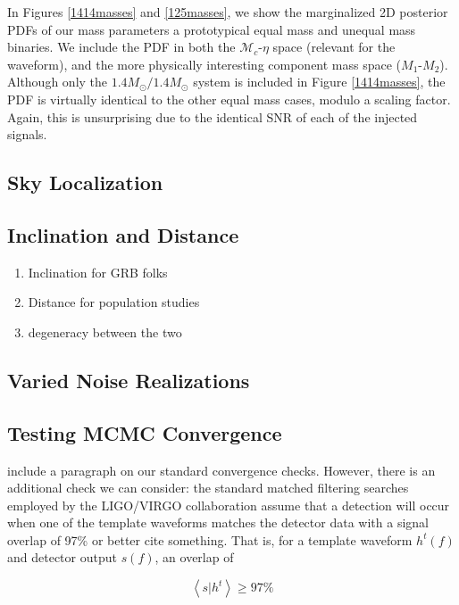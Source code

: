 \documentclass{emulateapj}
\newcommand{\carl}[1]{{\color{red}  #1}}
\begin{document}
In Figures \ref{1414masses} and \ref{125masses}, we show the marginalized 2D posterior PDFs of our mass parameters a prototypical equal mass and unequal mass binaries.  We include the PDF in both the $\mathcal{M}_c$-$\eta$ space (relevant for the waveform), and the more physically interesting component mass space ($M_1$-$M_2$).  Although only the $1.4M_{\odot}/1.4M_{\odot}$ system is included in Figure \ref{1414masses}, the PDF is virtually identical to the other equal mass cases, modulo a scaling factor.  Again, this is unsurprising due to the identical SNR of each of the injected signals.   

\subsection{Sky Localization}

\subsection{Inclination and Distance}

\begin{enumerate}
\item Inclination for GRB folks
\item Distance for population studies
\item degeneracy between the two
\end{enumerate}

\subsection{Varied Noise Realizations}
\label{NoisySubSection}
\subsection{Testing MCMC Convergence}

\carl{include a paragraph on our standard convergence checks}.  However, there is an additional check we can consider: the standard matched filtering searches employed by the LIGO/VIRGO collaboration assume that a detection will occur when one of the template waveforms matches the detector data with a signal overlap of 97\% or better \carl{cite something}.  That is, for a template waveform $h^{t}(f)$ and detector output $s(f)$, an overlap of

\begin{equation}
\left< s | h^{t}\right> \geq 97\%
\nonumber
\end{equation}
\end{document}
